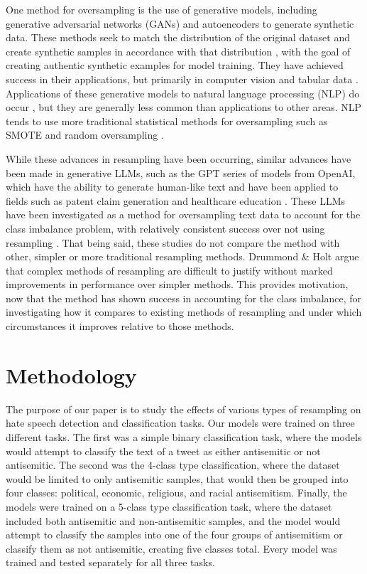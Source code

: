 \documentclass[runningheads]{llncs}
\begin{document}
One method for oversampling is the use of generative models, including generative adversarial networks (GANs) and autoencoders to generate synthetic data. These methods seek to match the distribution of the original dataset and create synthetic samples in accordance with that distribution \cite{hao}, with the goal of creating authentic synthetic examples for model training. They have achieved success in their applications, but primarily in computer vision and tabular data \cite{hao} \cite{engelmann} \cite{bellinger} \cite{dai}. Applications of these generative models to natural language processing (NLP) do occur \cite{phung}, but they are generally less common than applications to other areas. NLP tends to use more traditional statistical methods for oversampling such as SMOTE and random oversampling \cite{wijaya} \cite{glazkova}.

While these advances in resampling have been occurring, similar advances have been made in generative LLMs, such as the GPT series of models from OpenAI, which have the ability to generate human-like text \cite{floridi} and have been applied to fields such as patent claim generation \cite{hsiang} and healthcare education \cite{sallam}. These LLMs have been investigated as a method for oversampling text data to account for the class imbalance problem, with relatively consistent success over not using resampling \cite{edwards} \cite{usuga} \cite{shaikh}. That being said, these studies do not compare the method with other, simpler or more traditional resampling methods. Drummond \& Holt \cite{drummond} argue that complex methods of resampling are difficult to justify without marked improvements in performance over simpler methods. This provides motivation, now that the method has shown success in accounting for the class imbalance, for investigating how it compares to existing methods of resampling and under which circumstances it improves relative to those methods.

\section{Methodology}
The purpose of our paper is to study the effects of various types of resampling on hate speech detection and classification tasks. Our models were trained on three different tasks. The first was a simple binary classification task, where the models would attempt to classify the text of a tweet as either antisemitic or not antisemitic. The second was the 4-class type classification, where the dataset would be limited to only antisemitic samples, that would then be grouped into four classes: political, economic, religious, and racial antisemitism. Finally, the models were trained on a 5-class type classification task, where the dataset included both antisemitic and non-antisemitic samples, and the model would attempt to classify the samples into one of the four groups of antisemitism or classify them as not antisemitic, creating five classes total. Every model was trained and tested separately for all three tasks.
\end{document}
